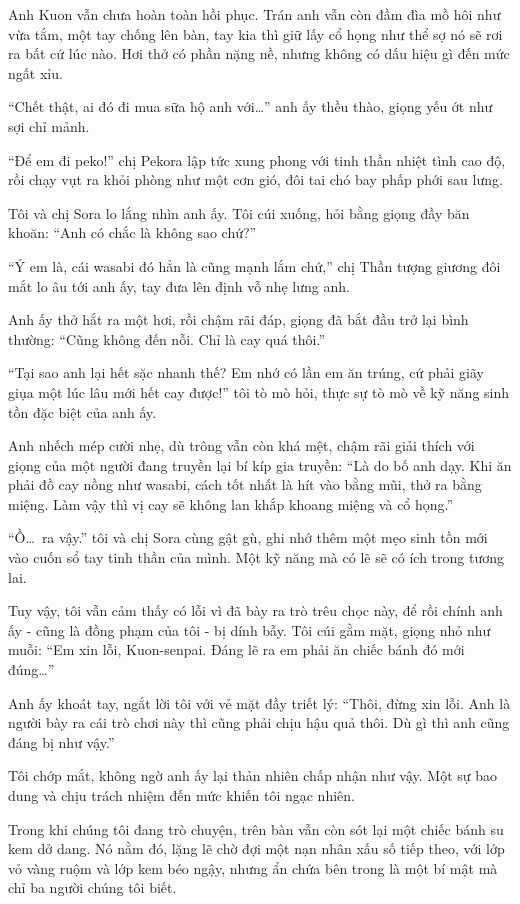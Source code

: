\documentclass[../main.tex]{subfiles}
\begin{document}
Anh Kuon vẫn chưa hoàn toàn hồi phục. Trán anh vẫn còn đầm đìa mồ hôi như vừa tắm, một tay chống lên bàn, tay kia thì giữ lấy cổ họng như thể sợ nó sẽ rơi ra bất cứ lúc nào. Hơi thở có phần nặng nề, nhưng không có dấu hiệu gì đến mức ngất xỉu.

``Chết thật, ai đó đi mua sữa hộ anh với\dots'' anh ấy thều thào, giọng yếu ớt như sợi chỉ mảnh.

``Để em đi peko!'' chị Pekora lập tức xung phong với tinh thần nhiệt tình cao độ, rồi chạy vụt ra khỏi phòng như một cơn gió, đôi tai chó bay phấp phới sau lưng.

Tôi và chị Sora lo lắng nhìn anh ấy. Tôi cúi xuống, hỏi bằng giọng đầy băn khoăn: ``Anh có chắc là không sao chứ?''

``Ý em là, cái wasabi đó hẳn là cũng mạnh lắm chứ,'' chị Thần tượng giương đôi mắt lo âu tới anh ấy, tay đưa lên định vỗ nhẹ lưng anh.

Anh ấy thở hắt ra một hơi, rồi chậm rãi đáp, giọng đã bắt đầu trở lại bình thường: ``Cũng không đến nỗi. Chỉ là cay quá thôi.''

``Tại sao anh lại hết sặc nhanh thế? Em nhớ có lần em ăn trúng, cứ phải giãy giụa một lúc lâu mới hết cay được!'' tôi tò mò hỏi, thực sự tò mò về kỹ năng sinh tồn đặc biệt của anh ấy.

Anh nhếch mép cười nhẹ, dù trông vẫn còn khá mệt, chậm rãi giải thích với giọng của một người đang truyền lại bí kíp gia truyền: ``Là do bố anh dạy. Khi ăn phải đồ cay nồng như wasabi, cách tốt nhất là hít vào bằng mũi, thở ra bằng miệng. Làm vậy thì vị cay sẽ không lan khắp khoang miệng và cổ họng.''

``Ồ\dots\ ra vậy.'' tôi và chị Sora cùng gật gù, ghi nhớ thêm một mẹo sinh tồn mới vào cuốn sổ tay tinh thần của mình. Một kỹ năng mà có lẽ sẽ có ích trong tương lai.

Tuy vậy, tôi vẫn cảm thấy có lỗi vì đã bày ra trò trêu chọc này, để rồi chính anh ấy - cũng là đồng phạm của tôi - bị dính bẫy. Tôi cúi gằm mặt, giọng nhỏ như muỗi: ``Em xin lỗi, Kuon-senpai. Đáng lẽ ra em phải ăn chiếc bánh đó mới đúng\dots''

Anh ấy khoát tay, ngắt lời tôi với vẻ mặt đầy triết lý: ``Thôi, đừng xin lỗi. Anh là người bày ra cái trò chơi này thì cũng phải chịu hậu quả thôi. Dù gì thì anh cũng đáng bị như vậy.''

Tôi chớp mắt, không ngờ anh ấy lại thản nhiên chấp nhận như vậy. Một sự bao dung và chịu trách nhiệm đến mức khiến tôi ngạc nhiên.

Trong khi chúng tôi đang trò chuyện, trên bàn vẫn còn sót lại một chiếc bánh su kem dở dang. Nó nằm đó, lặng lẽ chờ đợi một nạn nhân xấu số tiếp theo, với lớp vỏ vàng ruộm và lớp kem béo ngậy, nhưng ẩn chứa bên trong là một bí mật mà chỉ ba người chúng tôi biết.
\end{document}
